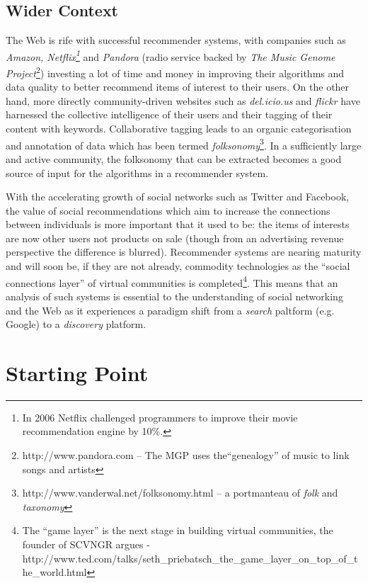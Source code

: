 \subsection*{Wider Context}

The Web is rife with successful recommender systems, with companies such as \textit{Amazon, Netflix\footnote{In 2006 Netflix challenged programmers to improve their movie recommendation engine by 10\%.}} and \textit{Pandora} (radio service backed by \textit{The Music Genome Project}\footnote{http://www.pandora.com -- The MGP uses the``genealogy'' of music to link songs and artists}) investing a lot of time and money in improving their algorithms and data quality to better recommend items of interest to their users. On the other hand, more directly community-driven websites such as \textit{del.icio.us} and \textit{flickr} have harnessed the collective intelligence of their users and their tagging of their content with keywords. Collaborative tagging leads to an organic categorisation and annotation of data which has been termed \textit{folksonomy}\footnote{http://www.vanderwal.net/folksonomy.html -- a portmanteau of \textit{folk} and \textit{taxonomy} }. In a sufficiently large and active community, the folksonomy that can be extracted becomes a good source of input for the algorithms in a recommender system. 

With the accelerating growth of social networks such as Twitter and Facebook, the value of social recommendations which aim to increase the connections between individuals is more important that it used to be: the items of interests are now other users not products on sale (though from an advertising revenue perspective the difference is blurred). Recommender systems are nearing maturity and will soon be, if they are not already, commodity technologies as the ``social connections layer'' of virtual communities is completed\footnote{The ``game layer'' is the next stage in building virtual communities, the founder of SCVNGR argues - http://www.ted.com/talks/seth\_priebatsch\_the\_game\_layer\_on\_top\_of\_the\_world.html}. This means that an analysis of such systems is essential to the understanding of social networking and the Web as it experiences a paradigm shift from a \emph{search} paltform (e.g. Google) to a \emph{discovery} platform.

\section{Starting Point}


